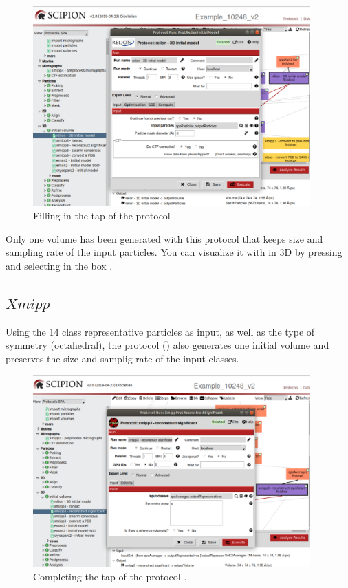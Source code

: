\begin{figure}[H]
  \centering
  \captionsetup{width=.8\linewidth} 
  \includegraphics[width=0.95\textwidth]
  {images/initial_vol_2.pdf}
  \caption{Filling in the  tap of the protocol .}
  \label{fig:initial_vol_2}
  \end{figure}

  Only one volume has been generated with this protocol that keeps size and sampling rate of the input particles. You can visualize it with \chimera in 3D by pressing  and selecting in the  box  . 
  
\subsection*{$Xmipp$}
Using the 14 class representative particles as input, as well as the type of symmetry (octahedral), the protocol  () also generates one initial volume and preserves the size and samplig rate of the input  classes.

\begin{figure}[H]
  \centering
  \captionsetup{width=.8\linewidth} 
  \includegraphics[width=0.95\textwidth]
  {images/xmipp_reconstruct_significant.pdf}
  \caption{Completing the  tap of the protocol .}
  \label{fig:xmipp_reconstruct_significant}
  \end{figure}


